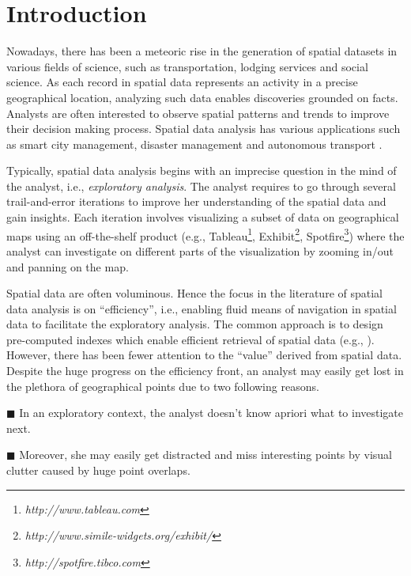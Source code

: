 \newpage
\section{Introduction}
Nowadays, there has been a meteoric rise in the generation of spatial datasets in various fields of science, such as transportation, lodging services and social science. As each record in spatial data represents an activity in a precise geographical location, analyzing such data enables discoveries grounded on facts. Analysts are often interested to observe spatial patterns and trends to improve their decision making process. Spatial data analysis has various applications such as smart city management, disaster management and autonomous transport \cite{RoddickEHPS04,Telang:2012}.

\vspace{2pt}
Typically, spatial data analysis begins with an imprecise question in the mind of the analyst, i.e., {\em exploratory analysis}. The analyst requires to go through several trail-and-error iterations to improve her understanding of the spatial data and gain insights. Each iteration involves visualizing a subset of data on geographical maps using an  off-the-shelf product (e.g., Tableau\footnote{\it http://www.tableau.com}, Exhibit\footnote{\it http://www.simile-widgets.org/exhibit/}, Spotfire\footnote{\it http://spotfire.tibco.com}) where the analyst can investigate on different parts of the visualization by zooming in/out and panning on the map. 

\vspace{3pt}
Spatial data are often voluminous. Hence the focus in the literature of spatial data analysis is on ``efficiency'', i.e., enabling fluid means of navigation in spatial data to facilitate the exploratory analysis. The common approach is to design pre-computed indexes which enable efficient retrieval of spatial data (e.g., \cite{lins2013nanocubes}). However, there has been fewer attention to the ``value'' derived from spatial data. Despite the huge progress on the efficiency front, an analyst may easily get lost in the plethora of geographical points due to two following reasons.

\vspace{3pt}
\noindent $\blacksquare$ In an exploratory context, the analyst doesn't know apriori what to investigate next.

\vspace{2pt}
\noindent $\blacksquare$ Moreover, she may easily get distracted and miss interesting points by visual clutter caused by huge point overlaps.

